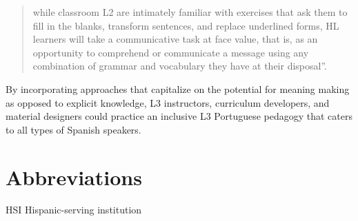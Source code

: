 \documentclass[output=paper]{../langscibook}
\begin{document}
\begin{quote}
while classroom L2 are intimately familiar with exercises that ask them to fill in the blanks, transform sentences, and replace underlined forms, HL learners will take a communicative task at face value, that is, as an opportunity to comprehend or communicate a message using any combination of grammar and vocabulary they have at their disposal”. \citep[121]{Zyzik2016}
\end{quote}

By incorporating approaches that capitalize on the potential for meaning making as opposed to explicit knowledge, L3 instructors, curriculum developers, and material designers could practice an inclusive L3 Portuguese pedagogy that caters to all types of Spanish speakers.


\section*{Abbreviations}
HSI Hispanic-serving institution

{\sloppy\printbibliography[heading=subbibliography,notkeyword=this]}
\end{document}
